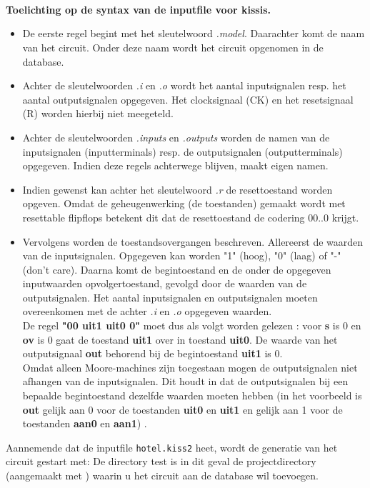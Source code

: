 \\
\\
\\
{\bf Toelichting op de syntax van de inputfile voor kissis.}
\begin{itemize}
\item
De eerste regel begint met het sleutelwoord {\it .model}. 
Daarachter komt de naam van het circuit. Onder deze naam wordt het circuit
opgenomen in de database.
\item
Achter de sleutelwoorden {\it .i} en {\it .o} wordt het aantal inputsignalen 
resp. het aantal outputsignalen opgegeven. Het clocksignaal (CK) en het 
resetsignaal (R) worden hierbij niet meegeteld.
\item
Achter de sleutelwoorden {\it .inputs} en {\it .outputs} worden de namen
van de inputsignalen (inputterminals) resp. de outputsignalen (outputterminals)
opgegeven. Indien deze regels achterwege blijven, maakt 
 eigen namen.
\item
Indien gewenst kan achter het sleutelwoord {\it .r} de resettoestand 
worden opgeven. Omdat de geheugenwerking (de toestanden) gemaakt wordt 
met resettable flipflops betekent dit dat de resettoestand de 
codering 00..0 krijgt.
\item
Vervolgens worden de toestandsovergangen beschreven. Allereerst de waarden
van de inputsignalen. 
Opgegeven kan worden "1" (hoog), "0" (laag) of "-" (don't care).
Daarna komt de begintoestand en de onder de opgegeven inputwaarden 
opvolgertoestand, gevolgd door de waarden van de outputsignalen. Het aantal inputsignalen en outputsignalen moeten overeenkomen met de achter {\it .i} en {\it .o}
opgegeven waarden. \\
De regel {\bf "00 uit1 uit0 0"} moet dus als volgt worden gelezen : voor {\bf s} is 0 en {\bf ov} is 0 gaat de toestand {\bf uit1} over in toestand {\bf uit0}. De waarde van het outputsignaal {\bf out} behorend bij de begintoestand {\bf uit1} is 0.\\
Omdat alleen Moore-machines zijn toegestaan mogen de outputsignalen niet afhangen van de inputsignalen. Dit houdt in dat de outputsignalen bij een bepaalde begintoestand dezelfde waarden moeten hebben 
(in het voorbeeld is {\bf out} gelijk aan 0 voor de toestanden {\bf uit0} en 
{\bf uit1} en gelijk aan 1 voor de toestanden {\bf aan0} en {\bf aan1}) .
\end{itemize}
Aannemende dat de inputfile {\tt hotel.kiss2} heet,
wordt de generatie van het circuit
gestart met: 
De directory test is in dit geval de projectdirectory (aangemaakt met ) waarin u het circuit aan de database wil toevoegen.\\
